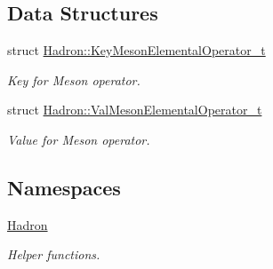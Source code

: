 \subsection*{Data Structures}
\begin{DoxyCompactItemize}
\item 
struct \mbox{\hyperlink{structHadron_1_1KeyMesonElementalOperator__t}{Hadron\+::\+Key\+Meson\+Elemental\+Operator\+\_\+t}}
\begin{DoxyCompactList}\small\item\em Key for Meson operator. \end{DoxyCompactList}\item 
struct \mbox{\hyperlink{structHadron_1_1ValMesonElementalOperator__t}{Hadron\+::\+Val\+Meson\+Elemental\+Operator\+\_\+t}}
\begin{DoxyCompactList}\small\item\em Value for Meson operator. \end{DoxyCompactList}\end{DoxyCompactItemize}
\subsection*{Namespaces}
\begin{DoxyCompactItemize}
\item 
 \mbox{\hyperlink{namespaceHadron}{Hadron}}
\begin{DoxyCompactList}\small\item\em Helper functions. \end{DoxyCompactList}\end{DoxyCompactItemize}
